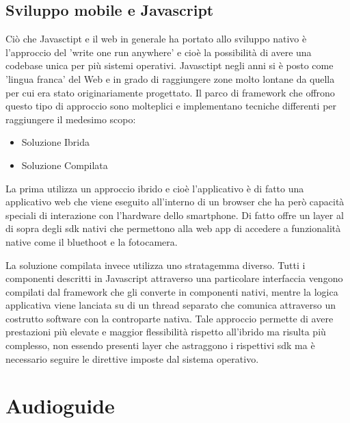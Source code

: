\subsection{Sviluppo mobile e Javascript}\vspace{5mm}

Ciò che Javasctipt e il web in generale ha portato allo sviluppo nativo è l'approccio del 'write one run anywhere' e cioè la possibilità di avere una codebase unica per più sistemi operativi. Javasctipt negli anni si è posto come 'lingua franca' del Web e in grado di raggiungere zone molto lontane da quella per cui era stato originariamente progettato. Il parco di framework che offrono questo tipo di approccio sono molteplici e implementano tecniche differenti per raggiungere il medesimo scopo:
\begin{itemize}
\item Soluzione Ibrida
\item Soluzione Compilata
\end{itemize}

La prima utilizza un approccio ibrido e cioè l'applicativo è di fatto una applicativo web che viene eseguito all'interno di un browser che ha però capacità speciali di interazione con l'hardware dello smartphone. Di fatto offre un layer al di sopra degli sdk nativi che permettono alla web app di accedere a funzionalità native come il bluethoot e la fotocamera.\vspace{5mm}

La soluzione compilata invece utilizza uno stratagemma diverso. Tutti i componenti descritti in Javascript attraverso una particolare interfaccia vengono compilati dal framework che gli converte in componenti nativi, mentre la logica applicativa viene lanciata su di un thread separato che comunica attraverso un costrutto software con la controparte nativa. Tale approccio permette di avere prestazioni più elevate e maggior flessibilità rispetto all'ibrido ma risulta più complesso, non essendo presenti layer che astraggono i rispettivi sdk ma è necessario seguire le direttive imposte dal sistema operativo.


\section{Audioguide}\vspace{5mm}

